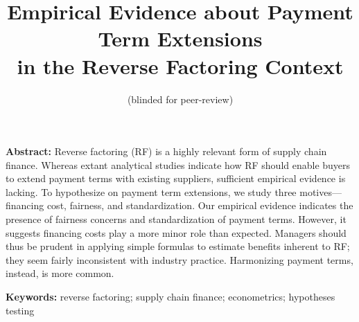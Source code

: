 \documentclass[a4paper,11pt]{article}
\title{Empirical Evidence about Payment Term Extensions\\ in the Reverse Factoring Context}
\date{}
\author{(blinded for peer-review)\vspace{-24pt}}
\renewcommand{\~}[1]{\tilde{#1}}
\renewcommand{\-}[1]{\overline{#1}}
\begin{document}
\maketitle%

\vspace{6pt}
\noindent%
\textbf{Abstract:} Reverse factoring (RF) is a highly relevant form of supply chain finance. Whereas extant analytical studies indicate how RF should enable buyers to extend payment terms with existing suppliers, sufficient empirical evidence is lacking. To hypothesize on payment term extensions, we study three motives---financing cost, fairness, and standardization. Our empirical evidence indicates the presence of fairness concerns and standardization of payment terms. However, it suggests financing costs play a more minor role than expected. Managers should thus be prudent in applying simple formulas to estimate benefits inherent to RF; they seem fairly inconsistent with industry practice. Harmonizing payment terms, instead, is more common.\vspace{3pt}
%

\noindent%
\textbf{Keywords:} reverse factoring; supply chain finance; econometrics; hypotheses testing

\doublespacing

\end{document}
